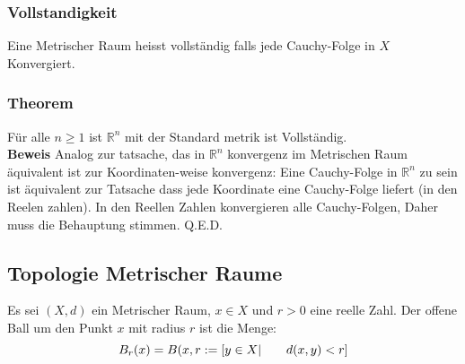 \documentclass{article}
\newcommand{\mspc}{\hspace{0.7cm}}
\newcommand{\beweis}{\\\textbf{Beweis }}
\newcommand{\theorem}[1]{\subsubsection*{Theorem {#1}}}
\begin{document}
\subsubsection*{Vollstandigkeit} Eine Metrischer Raum heisst vollständig falls jede Cauchy-Folge in $X$ Konvergiert.
\theorem{} Für alle $n\ge1$ ist $\mathbb{R}^n$ mit der Standard metrik ist Vollständig.
\beweis Analog zur tatsache, das in $\mathbb{R}^n$ konvergenz im Metrischen Raum äquivalent ist zur Koordinaten-weise konvergenz: Eine Cauchy-Folge in $\mathbb{R}^n$ zu sein ist äquivalent zur Tatsache dass jede Koordinate eine Cauchy-Folge liefert (in den Reelen zahlen).
In den Reellen Zahlen konvergieren alle Cauchy-Folgen, Daher muss die Behauptung stimmen. Q.E.D.
\subsection{Topologie Metrischer Raume}
Es sei $(X,d)$ ein Metrischer Raum, $x\in X$ und $r>0$ eine reelle Zahl. Der offene Ball um den Punkt $x$ mit radius $r$ ist die Menge:\[B_r(x)=B(x,r:=\left[y\in X|\mspc d(x,y)<r\right]\]
\end{document}
